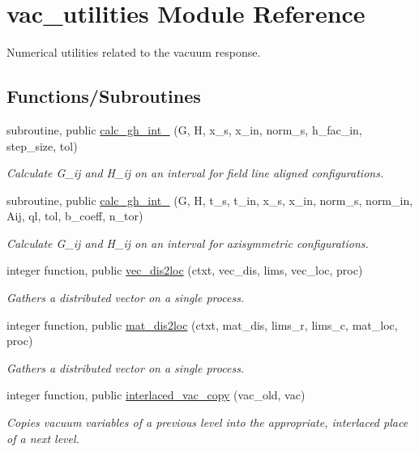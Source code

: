 \hypertarget{namespacevac__utilities}{}\section{vac\+\_\+utilities Module Reference}
\label{namespacevac__utilities}


Numerical utilities related to the vacuum response.  


\subsection*{Functions/\+Subroutines}
\begin{DoxyCompactItemize}
\item 
subroutine, public \hyperlink{namespacevac__utilities_aa8859980354d180445ed0437d7f51bcd}{calc\+\_\+gh\+\_\+int\+\_} (G, H, x\+\_\+s, x\+\_\+in, norm\+\_\+s, h\+\_\+fac\+\_\+in, step\+\_\+size, tol)
\begin{DoxyCompactList}\small\item\em Calculate G\+\_\+ij and H\+\_\+ij on an interval for field line aligned configurations. \end{DoxyCompactList}\item 
subroutine, public \hyperlink{namespacevac__utilities_af387fcaa54ec681e55d6eb685ad622bd}{calc\+\_\+gh\+\_\+int\+\_} (G, H, t\+\_\+s, t\+\_\+in, x\+\_\+s, x\+\_\+in, norm\+\_\+s, norm\+\_\+in, Aij, ql, tol, b\+\_\+coeff, n\+\_\+tor)
\begin{DoxyCompactList}\small\item\em Calculate G\+\_\+ij and H\+\_\+ij on an interval for axisymmetric configurations. \end{DoxyCompactList}\item 
integer function, public \hyperlink{namespacevac__utilities_a05e8e1f24569b4bff05e61a867268fc3}{vec\+\_\+dis2loc} (ctxt, vec\+\_\+dis, lims, vec\+\_\+loc, proc)
\begin{DoxyCompactList}\small\item\em Gathers a distributed vector on a single process. \end{DoxyCompactList}\item 
integer function, public \hyperlink{namespacevac__utilities_ae70e8a1fc132ba79a9a4f49f4944a352}{mat\+\_\+dis2loc} (ctxt, mat\+\_\+dis, lims\+\_\+r, lims\+\_\+c, mat\+\_\+loc, proc)
\begin{DoxyCompactList}\small\item\em Gathers a distributed vector on a single process. \end{DoxyCompactList}\item 
integer function, public \hyperlink{namespacevac__utilities_a8e7889688701f6ac2fd2c60cdee2b96a}{interlaced\+\_\+vac\+\_\+copy} (vac\+\_\+old, vac)
\begin{DoxyCompactList}\small\item\em Copies vacuum variables of a previous level into the appropriate, interlaced place of a next level. \end{DoxyCompactList}\end{DoxyCompactItemize}


